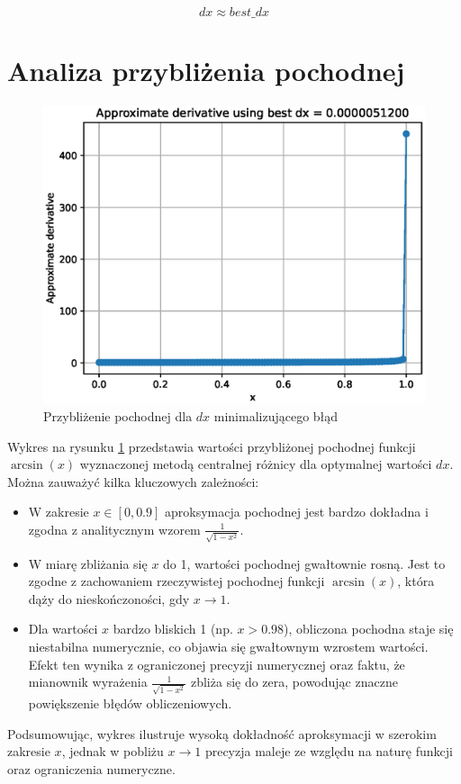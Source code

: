\documentclass{article}
\begin{document}
\[
dx \approx {best\_dx}
\]

\section{Analiza przybliżenia pochodnej}

\begin{figure}[H]
    \centering
    \includegraphics[width=1\linewidth]{Figure_2.eps}
    \caption{Przybliżenie pochodnej dla \( dx \) minimalizującego błąd}
    \label{fig:pochodna}
\end{figure}

Wykres na rysunku \ref{fig:pochodna} przedstawia wartości przybliżonej pochodnej funkcji \( \arcsin(x) \) wyznaczonej metodą centralnej różnicy dla optymalnej wartości \( dx \). Można zauważyć kilka kluczowych zależności:

\begin{itemize}
    \item W zakresie \( x \in [0, 0.9] \) aproksymacja pochodnej jest bardzo dokładna i zgodna z analitycznym wzorem \( \frac{1}{\sqrt{1 - x^2}} \).
    \item W miarę zbliżania się \( x \) do 1, wartości pochodnej gwałtownie rosną. Jest to zgodne z zachowaniem rzeczywistej pochodnej funkcji \( \arcsin(x) \), która dąży do nieskończoności, gdy \( x \to 1 \).
    \item Dla wartości \( x \) bardzo bliskich 1 (np. \( x > 0.98 \)), obliczona pochodna staje się niestabilna numerycznie, co objawia się gwałtownym wzrostem wartości. Efekt ten wynika z ograniczonej precyzji numerycznej oraz faktu, że mianownik wyrażenia \( \frac{1}{\sqrt{1 - x^2}} \) zbliża się do zera, powodując znaczne powiększenie błędów obliczeniowych.
\end{itemize}

Podsumowując, wykres ilustruje wysoką dokładność aproksymacji w szerokim zakresie \( x \), jednak w pobliżu \( x \to 1 \) precyzja maleje ze względu na naturę funkcji oraz ograniczenia numeryczne.
\end{document}
